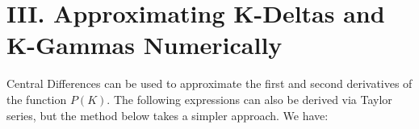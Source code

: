 \documentclass[12pt]{article}
\begin{document}
\vspace{15pt}

\section*{\large III. \indent Approximating K-Deltas and K-Gammas Numerically}

\vspace{15pt}

\begin{paragraph}
\indent Central Differences can be used to approximate the first and second derivatives of the function $P(K)$. The following expressions can also be derived via Taylor series, but the method below takes a simpler approach. We have:
\end{paragraph}
\end{document}

